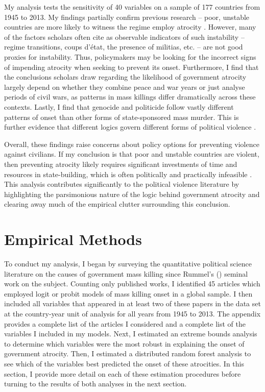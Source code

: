 \documentclass[a4paper,12pt]{article}
\begin{document}
My analysis tests the sensitivity of 40 variables on a sample of 177 countries from 1945 to 2013. My findings partially confirm previous research -- poor, unstable countries are more likely to witness the regime employ atrocity \citep[e.g.,][]{goldsmith2013forecasting,harff2003no,krain1997state}. However, many of the factors scholars often cite as observable indicators of such instability -- regime transitions, coups d'état, the presence of militias, etc. -- are not good proxies for instability. Thus, policymakers may be looking for the incorrect signs of impending atrocity when seeking to prevent its onset. Furthermore, I find that the conclusions scholars draw regarding the likelihood of government atrocity largely depend on whether they combine peace and war years or just analyse periods of civil wars, as patterns in mass killings differ dramatically across these contexts. Lastly, I find that genocide and politicide follow vastly different patterns of onset than other forms of state-sponsored mass murder. This is further evidence that different logics govern different forms of political violence \citep{stanton2013terrorism}.

Overall, these findings raise concerns about policy options for preventing violence against civilians. If my conclusion is that poor and unstable countries are violent, then preventing atrocity likely requires significant investments of time and resources in state-building, which is often politically and practically infeasible \citep{doyle2006making}.  This analysis contributes significantly to the political violence literature by highlighting the parsimonious nature of the logic behind government atrocity and clearing away much of the empirical clutter surrounding this conclusion. 
	
\section{Empirical Methods}
\label{sec:methods}
	
To conduct my analysis, I began by surveying the quantitative political science literature on the causes of government mass killing since Rummel's (\citeyear{rummel1995democracy}) seminal work on the subject. Counting only published works, I identified 45 articles which employed logit or probit models of mass killing onset in a global sample. I then included all variables that appeared in at least two of these papers in the data set at the country-year unit of analysis for all years from 1945 to 2013. The appendix provides a complete list of the articles I considered and a complete list of the variables I included in my models. Next, I estimated an extreme bounds analysis to determine which variables were the most robust in explaining the onset of government atrocity. Then, I estimated a distributed random forest analysis to see which of the variables best predicted the onset of these atrocities. In this section, I provide more detail on each of these estimation procedures before turning to the results of both analyses in the next section.
\end{document}
